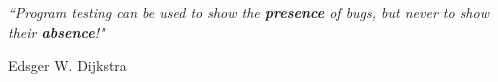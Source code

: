 \documentclass[11pt, oneside]{Thesis} %
\begin{document}
\clearpage %


\pagestyle{empty} %

\null\vfill %



\textit{``Program testing can be used to show the \textbf{presence} of bugs, but never to show their \textbf{absence}!"}
\begin{flushright}
    Edsger W. Dijkstra
\end{flushright}

\vfill\vfill\vfill\vfill\vfill\vfill\null %

\clearpage %



\end{document}
